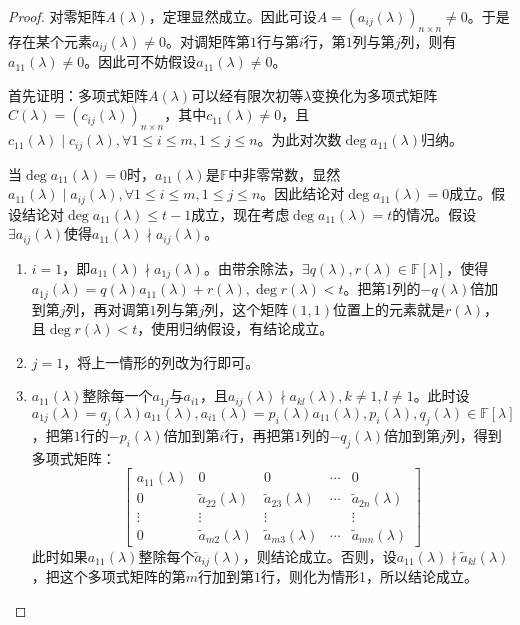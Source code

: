         \begin{proof}
            对零矩阵$A(\lambda)$，定理显然成立。因此可设$A=(a_{ij}(\lambda))_{n\times n}\neq0$。于是存在某个元素$a_{ij}(\lambda)\neq0$。对调矩阵第$1$行与第$i$行，第$1$列与第$j$列，则有$a_{11}(\lambda)\neq0$。因此可不妨假设$a_{11}(\lambda)\neq0$。

            首先证明：多项式矩阵$A(\lambda)$可以经有限次初等$\lambda$变换化为多项式矩阵$C(\lambda)=(c_{ij}(\lambda))_{n\times n}$，其中$c_{11}(\lambda)\neq0$，且$c_{11}(\lambda)\mid c_{ij}(\lambda),\forall 1\leq i\leq m,1\leq j\leq n$。为此对次数$\deg a_{11}(\lambda)$归纳。

            当$\deg a_{11}(\lambda)=0$时，$a_{11}(\lambda)$是$\mathbb{F}$中非零常数，显然$a_{11}(\lambda)\mid a_{ij}(\lambda),\forall 1\leq i\leq m,1\leq j\leq n$。因此结论对$\deg a_{11}(\lambda)=0$成立。假设结论对$\deg a_{11}(\lambda)\leq t-1$成立，现在考虑$\deg a_{11}(\lambda)=t$的情况。假设$\exists a_{ij}(\lambda)$使得$a_{11}(\lambda)\nmid a_{ij}(\lambda)$。

            \begin{enumerate}
                \item $i=1$，即$a_{11}(\lambda)\nmid a_{1j}(\lambda)$。由带余除法，$\exists q(\lambda),r(\lambda)\in\mathbb{F}[\lambda]$，使得$a_{1j}(\lambda)=q(\lambda)a_{11}(\lambda)+r(\lambda),\deg r(\lambda)<t$。把第$1$列的$-q(\lambda)$倍加到第$j$列，再对调第$1$列与第$j$列，这个矩阵$(1,1)$位置上的元素就是$r(\lambda)$，且$\deg r(\lambda)<t$，使用归纳假设，有结论成立。
                \item $j=1$，将上一情形的列改为行即可。
                \item $a_{11}(\lambda)$整除每一个$a_{1j}$与$a_{i1}$，且$a_{ij}(\lambda)\nmid a_{kl}(\lambda),k\neq1,l\neq1$。此时设$a_{1j}(\lambda)=q_j(\lambda)a_{11}(\lambda),a_{i1}(\lambda)=p_i(\lambda)a_{11}(\lambda),p_i(\lambda),q_j(\lambda)\in\mathbb{F}[\lambda]$，把第$1$行的$-p_i(\lambda)$倍加到第$i$行，再把第$1$列的$-q_j(\lambda)$倍加到第$j$列，得到多项式矩阵：
                      \[ \begin{bmatrix}a_{11}(\lambda)&0&0&\cdots&0\\0&\tilde{a}_{22}(\lambda)&\tilde{a}_{23}(\lambda)&\cdots&\tilde{a}_{2n}(\lambda)\\\vdots&\vdots&\vdots&&\vdots\\0&\tilde{a}_{m2}(\lambda)&\tilde{a}_{m3}(\lambda)&\cdots&\tilde{a}_{mn}(\lambda)\end{bmatrix}  \]
                      此时如果$a_{11}(\lambda)$整除每个$\tilde{a}_{ij}(\lambda)$，则结论成立。否则，设$a_{11}(\lambda)\nmid\tilde{a}_{kl}(\lambda)$，把这个多项式矩阵的第$m$行加到第$1$行，则化为情形1，所以结论成立。
            \end{enumerate}


\end{proof}
